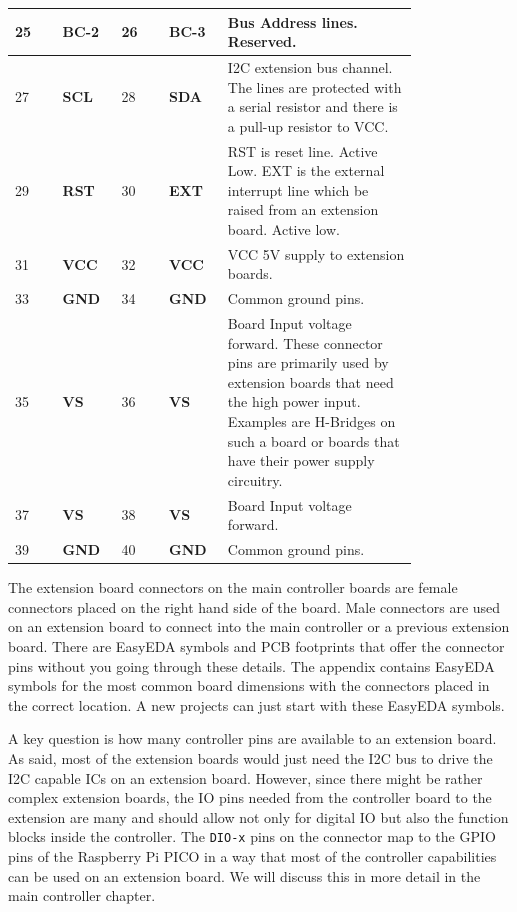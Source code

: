 \begin{longtable}{@{}|p{0.1\linewidth}|p{0.1\linewidth}|p{0.1\linewidth}|p{0.1\linewidth}|p{0.4\linewidth}|@{}}
    \midrule
    25 & \textbf{BC-2} & 26 & \textbf{BC-3} & Bus Address lines. Reserved. \\ 
    \midrule
    27 & \textbf{SCL} &  28 & \textbf{SDA} & I2C extension bus channel.  The lines are protected with a serial resistor and there is a pull-up resistor to VCC. \\
    \midrule
    29 & \textbf{RST} & 30 & \textbf{EXT} & RST is reset line. Active Low. EXT is the external interrupt line which be raised from an extension board. Active low. \\
    \midrule
    31 & \textbf{VCC} & 32 & \textbf{VCC} & VCC 5V supply to extension boards. \\
    \midrule
    33 & \textbf{GND} & 34 & \textbf{GND} & Common ground pins. \\
    \midrule
    35 & \textbf{VS} & 36 & \textbf{VS} & Board Input voltage forward. These  connector pins are primarily used by extension boards that need the high power input. Examples  are H-Bridges on such a board or boards that have their power supply circuitry. \\
    37 & \textbf{VS} & 38 & \textbf{VS} & Board Input voltage forward. \\
    \midrule
    39 & \textbf{GND} & 40 & \textbf{GND} & Common ground pins. \\
\end{longtable}  

The extension board connectors on the main controller boards are female connectors placed on the right hand side of the board. Male connectors are used on an extension board to connect into the main controller or a previous extension board. There are EasyEDA symbols and PCB footprints that offer the connector pins without you going through these details. The appendix contains EasyEDA symbols for the most common board dimensions with the connectors placed in the correct location. A new projects can just start with these EasyEDA symbols.

A key question is how many controller pins are available to an extension board. As said, most of the extension boards would just need the I2C bus to drive the I2C capable ICs on an extension board. However, since there might be rather complex extension boards, the IO pins needed from the controller board to the extension are many and should allow not only for digital IO but also the function blocks inside the controller. The \texttt{DIO-x} pins on the connector map to the GPIO pins of the Raspberry Pi PICO in a way that most of the controller capabilities can be used on an extension board. We will discuss this in more detail in the main controller chapter.

